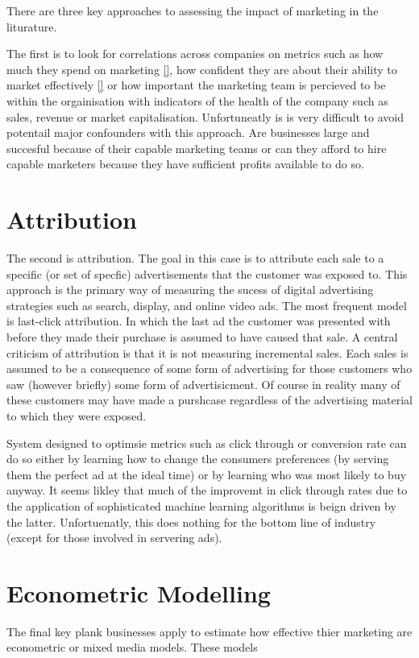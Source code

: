 \documentclass[11pt,a4paper,oneside]{book}
\begin{document}
There are three key approaches to assessing the impact of marketing in the liturature. 

The first is to look for correlations across companies on metrics such as how much they spend on marketing \ref{}, how confident they are about their ability to market effectively \ref{} or how important the marketing team is percieved to be within the orgainisation with indicators of the health of the company such as sales, revenue or market capitalisation. Unfortuneatly is is very difficult to avoid potentail major confounders with this approach. Are businesses large and succesful because of their capable marketing teams or can they afford to hire capable marketers because they have sufficient profits available to do so. 

\section*{Attribution}
The second is attribution. The goal in this case is to attribute each sale to a specific (or set of specfic) advertisements that the customer was exposed to. This approach is the primary way of measuring the sucess of digital advertising strategies such as search, display, and online video ads. The most frequent model is last-click attribution. In which the last ad the customer was presented with before they made their purchase is assumed to have caused that sale. A central criticism of attribution is that it is not measuring incremental sales. Each sales is assumed to be a consequence of some form of advertising for those customers who saw (however briefly) some form of advertisicment. Of course in reality many of these customers may have made a purshcase regardless of the advertising material to which they were exposed. 

System designed to optimsie metrics such as click through or conversion rate can do so either by learning how to change the consumers preferences (by serving them the perfect ad at the ideal time) or by learning who was most likely to buy anyway. It seems likley that much of the improvemt in click through rates due to the application of sophisticated machine learning algorithms is beign driven by the latter. Unfortuenatly, this does nothing for the bottom line of industry (except for those involved in servering ads). 


\section*{Econometric Modelling}
The final key plank businesses apply to estimate how effective thier marketing are econometric or mixed media models. These models
\end{document}
